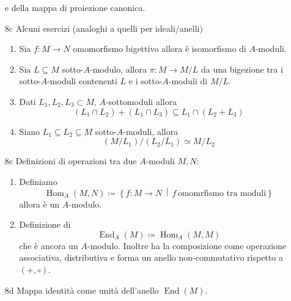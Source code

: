 \documentclass[italian]{article}
\begin{document}
\begin{enumerate}
        e della mappa di proiezione canonica.
      \item[8c] Alcuni esercizi (analoghi a quelli per ideali/anelli)
        \begin{enumerate}
            \item Sia $f \colon M \to N$ omomorfismo bigettivo allora
                è isomorfismo di $A$-moduli.
            \item Sia $L \subseteq M$ sotto-$A$-modulo, allora $\pi : M \to M/L$ da
                una bigezione tra i sotto-$A$-moduli contenenti $L$ e i 
                sotto-$A$-moduli di $M/L$.
            \item Dati $L_1,L_2,L_3 \subset M$, $A$-sottomoduli allora
              \begin{equation*}
                (L_1 \cap L_2) + (L_1 \cap L_3) \subseteq L_1 \cap (L_2 + L_3) 
              \end{equation*}
            \item Siano $L_1 \subseteq L_2 \subseteq M$ sotto-$A$-moduli, allora
              \begin{equation*}
                (M/L_1)/(L_2/L_1) \simeq M/L_2
              \end{equation*}
      \end{enumerate}
      \item[8c] Definizioni di operazioni tra due $A$-moduli $M,N$:
        \begin{enumerate}
          \item Definiamo 
            \begin{equation*}
              \operatorname{Hom}_A(M,N) \coloneqq \left\{ f \colon M \to
              N \,\middle|\, f\, \text{omomrfismo tra moduli} \right\}
          \end{equation*}
          allora è un $A$-modulo.
        \item Definizione di 
          \begin{equation*}
            \operatorname{End}_A(M) \coloneqq \operatorname{Hom}_A(M,M)
          \end{equation*}
          che è ancora un $A$-modulo. Inoltre ha la composizione come operazione
          associativa, distributiva e forma un anello non-commutativo rispetto
          a $(+, \circ)$.
        \end{enumerate}
      \item[8d] Mappa identità come unità dell'anello $\operatorname{End}(M)$.
    \end{enumerate}
\end{document}
